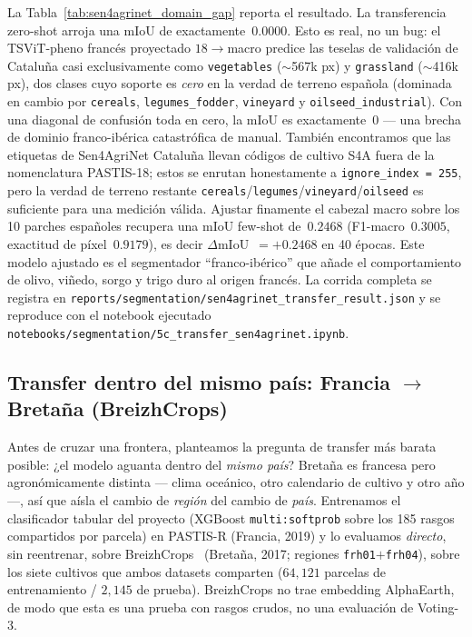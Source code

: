 La Tabla~\ref{tab:sen4agrinet_domain_gap} reporta el resultado. La
transferencia zero-shot arroja una mIoU de exactamente~$0.0000$. Esto es
real, no un bug: el TSViT-pheno francés proyectado $18\rightarrow$macro
predice las teselas de validación de Cataluña casi exclusivamente como
\texttt{vegetables} ($\sim$567k px) y \texttt{grassland} ($\sim$416k px),
dos clases cuyo soporte es \emph{cero} en la verdad de terreno española
(dominada en cambio por \texttt{cereals}, \texttt{legumes\_fodder},
\texttt{vineyard} y \texttt{oilseed\_industrial}). Con una diagonal de
confusión toda en cero, la mIoU es exactamente~0 --- una brecha de
dominio franco-ibérica catastrófica de manual. También encontramos que
las etiquetas de Sen4AgriNet Cataluña llevan códigos de cultivo S4A fuera
de la nomenclatura PASTIS-18; estos se enrutan honestamente a
\texttt{ignore\_index = 255}, pero la verdad de terreno restante
\texttt{cereals}/\texttt{legumes}/\texttt{vineyard}/\texttt{oilseed} es
suficiente para una medición válida. Ajustar finamente el cabezal macro
sobre los 10 parches españoles recupera una mIoU few-shot de~$0.2468$
(F1-macro~$0.3005$, exactitud de píxel~$0.9179$), es decir
$\Delta$mIoU~$= +0.2468$ en 40 épocas. Este modelo ajustado es el
segmentador ``franco-ibérico'' que añade el comportamiento de olivo,
viñedo, sorgo y trigo duro al origen francés. La corrida completa se
registra en
\texttt{reports/segmentation/sen4agrinet\_transfer\_result.json} y se
reproduce con el notebook ejecutado
\texttt{notebooks/segmentation/5c\_transfer\_sen4agrinet.ipynb}.



\subsection{Transfer dentro del mismo país: Francia $\rightarrow$ Bretaña (BreizhCrops)}
\label{sec:multiregion:breizhcrops}

Antes de cruzar una frontera, planteamos la pregunta de transfer más barata posible: ¿el
modelo aguanta dentro del \emph{mismo país}? Bretaña es francesa pero agronómicamente
distinta --- clima oceánico, otro calendario de cultivo y otro año ---, así que aísla el
cambio de \emph{región} del cambio de \emph{país}. Entrenamos el clasificador tabular del
proyecto (XGBoost \texttt{multi:softprob} sobre los 185 rasgos compartidos por parcela)
en PASTIS-R (Francia, 2019) y lo evaluamos \emph{directo}, sin reentrenar, sobre
BreizhCrops~\cite{russwurm2020breizhcrops} (Bretaña, 2017; regiones
\texttt{frh01}$+$\texttt{frh04}), sobre los siete cultivos que ambos datasets comparten
($64{,}121$ parcelas de entrenamiento / $2{,}145$ de prueba). BreizhCrops no trae embedding
AlphaEarth, de modo que esta es una prueba con rasgos crudos, no una evaluación de Voting-3.

